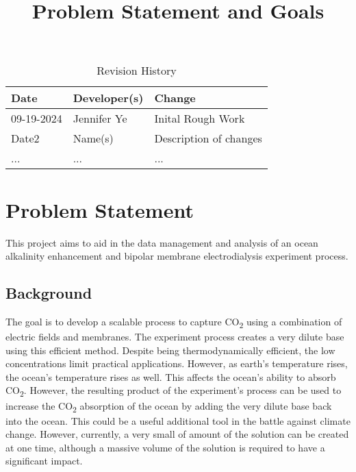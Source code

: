 \documentclass{article}
\title{Problem Statement and Goals\\\progname}
\author{\authname}
\date{}
\begin{document}
\maketitle

\begin{table}[hp]
\caption{Revision History} \label{TblRevisionHistory}
\begin{tabularx}{\textwidth}{llX}
\toprule
\textbf{Date} & \textbf{Developer(s)} & \textbf{Change}\\
\midrule
09-19-2024 & Jennifer Ye & Inital Rough Work \\
Date2 & Name(s) & Description of changes\\
... & ... & ...\\
\bottomrule
\end{tabularx}
\end{table}


\section{Problem Statement}
This project aims to aid in the data management and analysis of an ocean
alkalinity enhancement and bipolar membrane electrodialysis experiment process.


\subsection{Background}
The goal is to develop a scalable process to capture CO\textsubscript{2} using a
combination of electric fields and membranes. The experiment process creates a
very dilute base using this efficient method. Despite being thermodynamically
efficient, the low concentrations limit practical applications. However, as
earth's temperature rises, the ocean's temperature rises as well. This affects
the ocean's ability to absorb CO\textsubscript{2}. However, the resulting
product of the experiment's process can be used to increase the
CO\textsubscript{2} absorption of the ocean by adding the very dilute base back
into the ocean. This could be a useful additional tool in the battle against
climate change. However, currently, a very small of amount of the solution can be created at
one time, although a massive volume of the solution is required to have a
significant impact.
\end{document}
